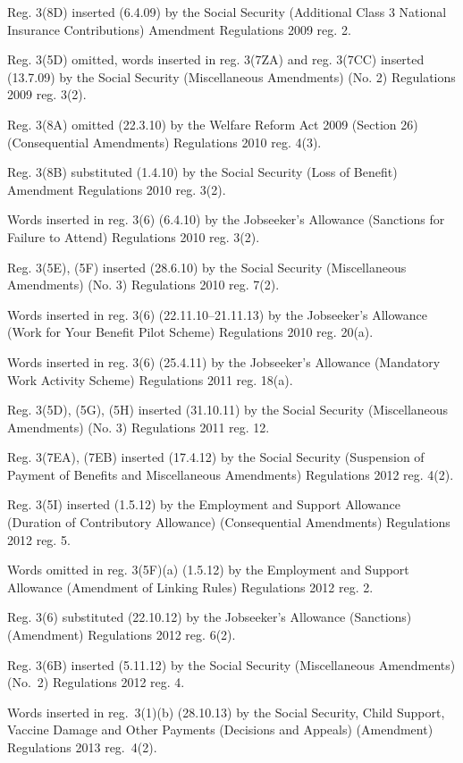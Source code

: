 \documentclass[12pt,a4paper]{article}
\begin{document}
{Reg. 3(8D) inserted (6.4.09) by the Social Security (Additional Class 3 National Insurance Contributions) Amendment Regulations 2009 reg. 2.

Reg. 3(5D) omitted, words inserted in reg. 3(7ZA) and reg. 3(7CC) inserted (13.7.09) by the Social Security (Miscellaneous Amendments) (No. 2) Regulations 2009 reg. 3(2).

Reg. 3(8A) omitted (22.3.10) by the Welfare Reform Act 2009 (Section 26) (Consequential Amendments) Regulations 2010 reg. 4(3).

Reg. 3(8B) substituted (1.4.10) by the Social Security (Loss of Benefit) Amendment Regulations 2010 reg. 3(2).

Words inserted in reg. 3(6) (6.4.10) by the Jobseeker’s Allowance (Sanctions for Failure to Attend) Regulations 2010 reg. 3(2).

Reg. 3(5E), (5F) inserted (28.6.10) by the Social Security (Miscellaneous Amendments) (No. 3) Regulations 2010 reg. 7(2).

Words inserted in reg. 3(6) (22.11.10--21.11.13) by the Jobseeker’s Allowance (Work for Your Benefit Pilot Scheme) Regulations 2010 reg. 20(a).

Words inserted in reg. 3(6) (25.4.11) by the Jobseeker’s Allowance (Mandatory Work Activity Scheme) Regulations 2011 reg. 18(a).

Reg. 3(5D), (5G), (5H) inserted (31.10.11) by the Social Security (Miscellaneous Amendments) (No. 3) Regulations 2011 reg. 12.

Reg. 3(7EA), (7EB) inserted (17.4.12) by the Social Security (Suspension of Payment of Benefits and Miscellaneous Amendments) Regulations 2012 reg. 4(2).

Reg. 3(5I) inserted (1.5.12) by the Employment and Support Allowance (Duration of Contributory Allowance) (Consequential Amendments) Regulations 2012 reg. 5.

Words omitted in reg. 3(5F)(a) (1.5.12) by the Employment and Support Allowance (Amendment of Linking Rules) Regulations 2012 reg. 2.

Reg. 3(6) substituted (22.10.12) by the Jobseeker’s Allowance (Sanctions) (Amendment) Regulations 2012 reg. 6(2).

Reg. 3(6B) inserted (5.11.12) by the Social Security (Miscellaneous Amendments) (No.~2) Regulations 2012 reg. 4.

Words inserted in reg.~3(1)(b) (28.10.13) by the Social Security, Child Support, Vaccine Damage and Other Payments (Decisions and Appeals) (Amendment) Regulations 2013 reg.~4(2).

}
\end{document}
